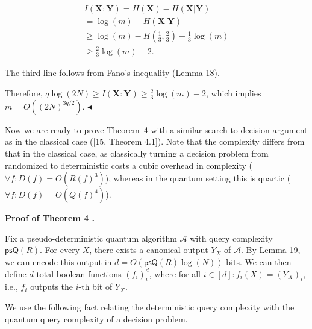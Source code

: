\[\begin{gathered}
\displaystyle I(\mathbf{X}:\mathbf{Y}) \displaystyle=H(\mathbf{X})-H(\mathbf{X}|\mathbf{Y}) \\
\displaystyle=\log(m)-H(\mathbf{X}|\mathbf{Y}) \\
\displaystyle\geq\log(m)-H\left(\frac{1}{3},\frac{2}{3}\right)-\frac{1}{3}\log(m) \\
\displaystyle\geq\frac{2}{3}\log(m)-2.
\end{gathered}\]


The third line follows from Fano’s inequality (Lemma 18).\par




Therefore, $q\log(2N)\geq I(\mathbf{X}:\mathbf{Y})\geq\frac{2}{3}\log(m)-2$, which implies $m=O((2N)^{3q/2})$.
$\blacktriangleleft$\par




Now we are ready to prove Theorem 4 with a similar search-to-decision argument as in the classical case ([15, Theorem 4.1]). Note that the complexity differs from that in the classical case, as classically turning a decision problem from randomized to deterministic costs a cubic overhead in complexity ($\forall f:D(f)=O(R(f)^{3})$), whereas in the quantum setting this is quartic ($\forall f:D(f)=O(Q(f)^{4})$).\par





\par\medskip\noindent\textbf{Proof of Theorem 4 .}\par




Fix a pseudo-deterministic quantum algorithm $\mathcal{A}$ with query complexity $\mathsf{psQ}(R)$.
For every $X$, there exists a canonical output $Y_{X}$ of $\mathcal{A}$. By Lemma 19, we can encode this output in $d=O(\mathsf{psQ}(R)\log(N))$ bits.
We can then define $d$ total boolean functions $(f_{i})_{i}^{d}$, where for all $i\in[d]:f_{i}(X)=(Y_{X})_{i}$, i.e., $f_{i}$ outputs the $i$-th bit of $Y_{X}$.\par




We use the following fact relating the deterministic query complexity with the quantum query complexity of a decision problem.\par





